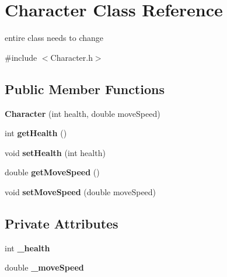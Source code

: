 \hypertarget{class_character}{}\section{Character Class Reference}
\label{class_character}


entire class needs to change  




{\ttfamily \#include $<$Character.\+h$>$}

\subsection*{Public Member Functions}
\begin{DoxyCompactItemize}
\item 
\mbox{\label{class_character_a888669b1ef81595716c493140b4fd631}} 
{\bfseries Character} (int health, double move\+Speed)
\item 
\mbox{\label{class_character_ae24a44b8a22d0727dd4e2c46a1df66f5}} 
int {\bfseries get\+Health} ()
\item 
\mbox{\label{class_character_afd06ab5d08a0edc75539f3586ccac66d}} 
void {\bfseries set\+Health} (int health)
\item 
\mbox{\label{class_character_a93daa12dd217ac297c29821e3a0c7907}} 
double {\bfseries get\+Move\+Speed} ()
\item 
\mbox{\label{class_character_a4c25224267e2c0d6ae391223b2313d49}} 
void {\bfseries set\+Move\+Speed} (double move\+Speed)
\end{DoxyCompactItemize}
\subsection*{Private Attributes}
\begin{DoxyCompactItemize}
\item 
\mbox{\label{class_character_a12cb31e72b95a547610ad2ac9b3f9728}} 
int {\bfseries \+\_\+health}
\item 
\mbox{\label{class_character_a1b6dbdfaba2fe288b459407690d4ec08}} 
double {\bfseries \+\_\+move\+Speed}
\end{DoxyCompactItemize}



